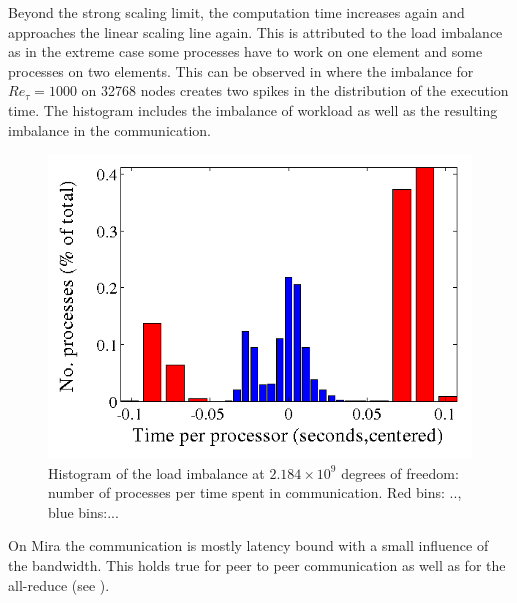 \documentclass{sig-alternate}
\begin{document}
Beyond the strong scaling limit, the computation time increases again and
approaches the linear scaling line again. This is attributed to the load
imbalance as in the extreme case some processes have to work on one element and
some processes on two elements. This can be observed in
where the imbalance for $Re_{\tau}=1000$ on 32768 nodes creates two spikes in the
distribution of the execution time. The histogram includes the imbalance of
workload as well as the resulting imbalance in the communication.
\begin{figure}
  \centering
  \includegraphics[width=\linewidth]{./figures/histogram.png}
  \caption{Histogram of the load imbalance at $2.184\times10^9$ degrees of freedom: number of processes per time spent in communication. Red bins: .., blue bins:...}
  \label{fig:imbalancehist}
\end{figure}


On Mira the communication is mostly latency bound with a small influence of the
bandwidth. This holds true for peer to peer communication as well as for the
all-reduce (see ).
\end{document}
